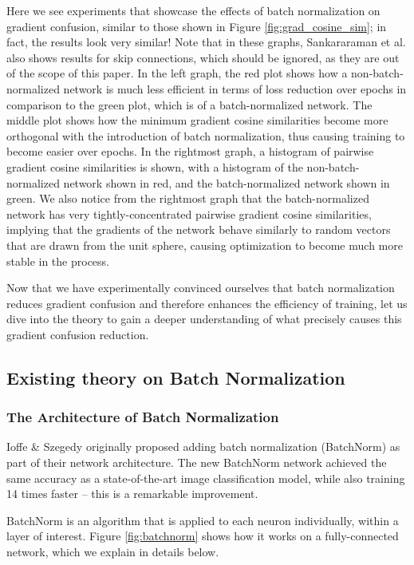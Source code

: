 \documentclass{article}
\begin{document}
Here we see experiments that showcase the effects of batch normalization on gradient confusion, similar to those shown in Figure \ref{fig:grad_cosine_sim}; in fact, the results look very similar! Note that in these graphs, Sankararaman et al. also shows results for skip connections, which should be ignored, as they are out of the scope of this paper. In the left graph, the red plot shows how a non-batch-normalized network is much less efficient in terms of loss reduction over epochs in comparison to the green plot, which is of a batch-normalized network. The middle plot shows how the minimum gradient cosine similarities become more orthogonal with the introduction of batch normalization, thus causing training to become easier over epochs. In the rightmost graph, a histogram of pairwise gradient cosine similarities is shown, with a histogram of the non-batch-normalized network shown in red, and the batch-normalized network shown in green. We also notice from the rightmost graph that the batch-normalized network has very tightly-concentrated pairwise gradient cosine similarities, implying that the gradients of the network behave similarly to random vectors that are drawn from the unit sphere, causing optimization to become much more stable in the process.

Now that we have experimentally convinced ourselves that batch normalization reduces gradient confusion and therefore enhances the efficiency of training, let us dive into the theory to gain a deeper understanding of what precisely causes this gradient confusion reduction.

\subsection{Existing theory on Batch Normalization}
\subsubsection{The Architecture of Batch Normalization}

Ioffe \& Szegedy \cite{batchnorm} originally proposed adding batch normalization (BatchNorm) as part of their network architecture. The new BatchNorm network achieved the same accuracy as a state-of-the-art image classification model, while also training 14 times faster -- this is a remarkable improvement.

BatchNorm is an algorithm that is applied to each neuron individually, within a layer of interest. Figure \ref{fig:batchnorm} shows how it works on a fully-connected network, which we explain in details below.
\end{document}

